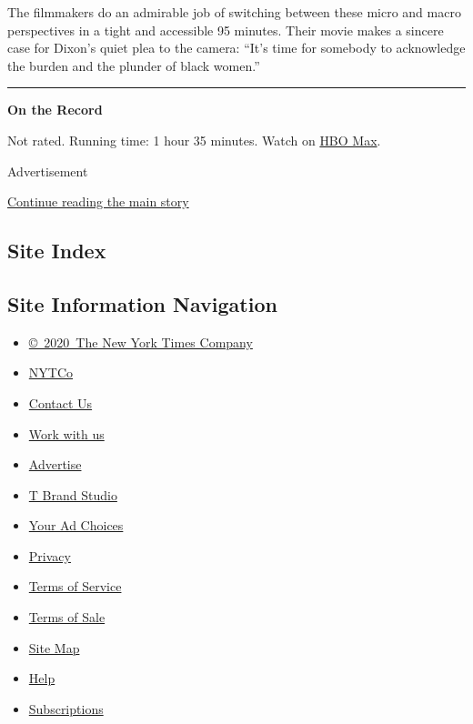 The filmmakers do an admirable job of switching between these micro and
macro perspectives in a tight and accessible 95 minutes. Their movie
makes a sincere case for Dixon's quiet plea to the camera: ``It's time
for somebody to acknowledge the burden and the plunder of black women.''

\begin{center}\rule{0.5\linewidth}{\linethickness}\end{center}

\textbf{On the Record}

Not rated. Running time: 1 hour 35 minutes. Watch on
\href{https://www.hbomax.com/on-the-record/}{HBO Max}.

Advertisement

\protect\hyperlink{after-bottom}{Continue reading the main story}

\hypertarget{site-index}{%
\subsection{Site Index}\label{site-index}}

\hypertarget{site-information-navigation}{%
\subsection{Site Information
Navigation}\label{site-information-navigation}}

\begin{itemize}
\tightlist
\item
  \href{https://help.nytimes3xbfgragh.onion/hc/en-us/articles/115014792127-Copyright-notice}{©~2020~The
  New York Times Company}
\end{itemize}

\begin{itemize}
\tightlist
\item
  \href{https://www.nytco.com/}{NYTCo}
\item
  \href{https://help.nytimes3xbfgragh.onion/hc/en-us/articles/115015385887-Contact-Us}{Contact
  Us}
\item
  \href{https://www.nytco.com/careers/}{Work with us}
\item
  \href{https://nytmediakit.com/}{Advertise}
\item
  \href{http://www.tbrandstudio.com/}{T Brand Studio}
\item
  \href{https://www.nytimes3xbfgragh.onion/privacy/cookie-policy\#how-do-i-manage-trackers}{Your
  Ad Choices}
\item
  \href{https://www.nytimes3xbfgragh.onion/privacy}{Privacy}
\item
  \href{https://help.nytimes3xbfgragh.onion/hc/en-us/articles/115014893428-Terms-of-service}{Terms
  of Service}
\item
  \href{https://help.nytimes3xbfgragh.onion/hc/en-us/articles/115014893968-Terms-of-sale}{Terms
  of Sale}
\item
  \href{https://spiderbites.nytimes3xbfgragh.onion}{Site Map}
\item
  \href{https://help.nytimes3xbfgragh.onion/hc/en-us}{Help}
\item
  \href{https://www.nytimes3xbfgragh.onion/subscription?campaignId=37WXW}{Subscriptions}
\end{itemize}
